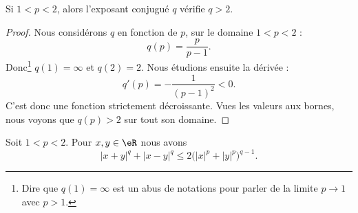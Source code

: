 	\begin{lemma}       \label{LEMooFGKXooZCHNln}
		Si \( 1<p<2\), alors l'exposant conjugué \( q\) vérifie \( q>2\).
	\end{lemma}

	\begin{proof}
		Nous considérons \( q\) en fonction de \( p\), sur le domaine \( 1<p<2\) :
		\begin{equation}
			q(p)=\frac{ p }{ p-1 }.
		\end{equation}
		Donc\footnote{Dire que \( q(1)=\infty\) est un abus de notations pour parler de la limite \( p\to 1\) avec \( p>1\).} \( q(1)=\infty\) et \( q(2)=2\). Nous étudions ensuite la dérivée :
		\begin{equation}
			q'(p)=-\frac{1}{ (p-1)^2 }<0.
		\end{equation}
		C'est donc une fonction strictement décroissante. Vues les valeurs aux bornes, nous voyons que \( q(p)>2\) sur tout son domaine.
	\end{proof}

	\begin{lemma}         \label{LEMooMKIXooVOYaxI}
		Soit \( 1<p<2\). Pour \( x,y\in \eR\) nous avons
		\begin{equation}
			| x+y |^q+| x-y |^q\leq 2\big( | x |^p+| y |^p \big)^{q-1}.
		\end{equation}
	\end{lemma}

